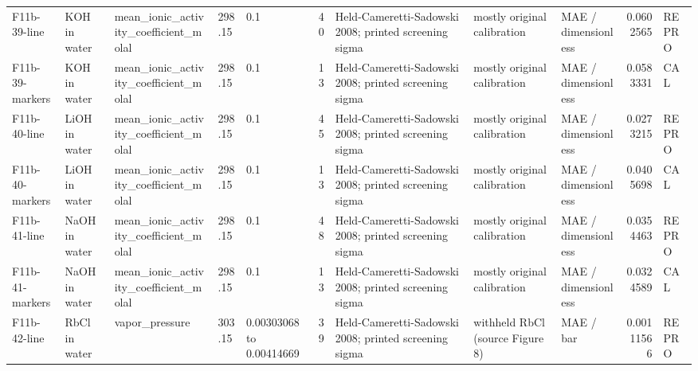 \begin{landscape}
\begin{longtable}{L{1.9cm}L{2.5cm}L{2.1cm}L{1.6cm}L{1.6cm}rL{2.4cm}L{1.9cm}L{2.2cm}rL{1cm}}
F11b-\allowbreak{}39-\allowbreak{}line & KOH in water & mean\_\allowbreak{}ionic\_\allowbreak{}activity\_\allowbreak{}coefficient\_\allowbreak{}molal & 298.15 & 0.1 & 40 & Held-\allowbreak{}Cameretti-\allowbreak{}Sadowski 2008; printed screening sigma & mostly original calibration & MAE /\allowbreak{} dimensionless & 0.0602565 & REPRO \\
F11b-\allowbreak{}39-\allowbreak{}markers & KOH in water & mean\_\allowbreak{}ionic\_\allowbreak{}activity\_\allowbreak{}coefficient\_\allowbreak{}molal & 298.15 & 0.1 & 13 & Held-\allowbreak{}Cameretti-\allowbreak{}Sadowski 2008; printed screening sigma & mostly original calibration & MAE /\allowbreak{} dimensionless & 0.0583331 & CAL \\
F11b-\allowbreak{}40-\allowbreak{}line & LiOH in water & mean\_\allowbreak{}ionic\_\allowbreak{}activity\_\allowbreak{}coefficient\_\allowbreak{}molal & 298.15 & 0.1 & 45 & Held-\allowbreak{}Cameretti-\allowbreak{}Sadowski 2008; printed screening sigma & mostly original calibration & MAE /\allowbreak{} dimensionless & 0.0273215 & REPRO \\
F11b-\allowbreak{}40-\allowbreak{}markers & LiOH in water & mean\_\allowbreak{}ionic\_\allowbreak{}activity\_\allowbreak{}coefficient\_\allowbreak{}molal & 298.15 & 0.1 & 13 & Held-\allowbreak{}Cameretti-\allowbreak{}Sadowski 2008; printed screening sigma & mostly original calibration & MAE /\allowbreak{} dimensionless & 0.0405698 & CAL \\
F11b-\allowbreak{}41-\allowbreak{}line & NaOH in water & mean\_\allowbreak{}ionic\_\allowbreak{}activity\_\allowbreak{}coefficient\_\allowbreak{}molal & 298.15 & 0.1 & 48 & Held-\allowbreak{}Cameretti-\allowbreak{}Sadowski 2008; printed screening sigma & mostly original calibration & MAE /\allowbreak{} dimensionless & 0.0354463 & REPRO \\
F11b-\allowbreak{}41-\allowbreak{}markers & NaOH in water & mean\_\allowbreak{}ionic\_\allowbreak{}activity\_\allowbreak{}coefficient\_\allowbreak{}molal & 298.15 & 0.1 & 13 & Held-\allowbreak{}Cameretti-\allowbreak{}Sadowski 2008; printed screening sigma & mostly original calibration & MAE /\allowbreak{} dimensionless & 0.0324589 & CAL \\
F11b-\allowbreak{}42-\allowbreak{}line & RbCl in water & vapor\_\allowbreak{}pressure & 303.15 & 0.00303068 to 0.00414669 & 39 & Held-\allowbreak{}Cameretti-\allowbreak{}Sadowski 2008; printed screening sigma & withheld RbCl (source Figure 8) & MAE /\allowbreak{} bar & 0.00111566 & REPRO \\

\end{longtable}
\end{landscape}
